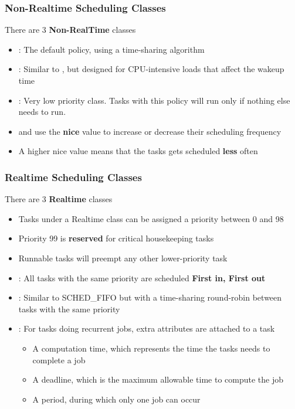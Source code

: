 \begin{frame}
	\frametitle{Non-Realtime Scheduling Classes}
	There are 3 \textbf{Non-RealTime} classes
	\begin{itemize}
		\item {} : The default policy, using a time-sharing algorithm
		\item {} : Similar to , but designed for CPU-intensive loads that affect the wakeup time
		\item {} : Very low priority class. Tasks with this policy will run only if nothing else needs to run.
		\item {} and  use the \textbf{nice} value to increase or decrease their scheduling frequency
		\item A higher nice value means that the tasks gets scheduled \textbf{less} often
	\end{itemize}
\end{frame}

\begin{frame}
	\frametitle{Realtime Scheduling Classes}
	There are 3 \textbf{Realtime} classes
	\begin{itemize}
		\item Tasks under a Realtime class can be assigned a priority between 0 and 98
		\item Priority 99 is \textbf{reserved} for critical housekeeping tasks
		\item Runnable tasks will preempt any other lower-priority task
		\item {} : All tasks with the same priority are scheduled \textbf{First in, First out}
		\item {} : Similar to SCHED\_FIFO but with a time-sharing round-robin between tasks with the same priority
		\item {} : For tasks doing recurrent jobs, extra attributes are attached to a task
			\begin{itemize}
				\item A computation time, which represents the time the tasks needs to complete a job
				\item A deadline, which is the maximum allowable time to compute the job
				\item A period, during which only one job can occur
			\end{itemize}
	\end{itemize}
\end{frame}

